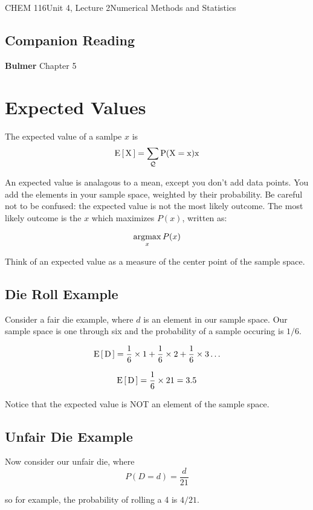 \documentclass{article}
\begin{document}
\begin{tdoc}{CHEM 116}{Unit 4, Lecture 2}{Numerical Methods and Statistics}


    \subsection*{Companion Reading}
    \textbf{Bulmer} Chapter 5

\section{Expected Values}

The expected value of a samlpe $x$ is
\begin{equation}
\rm{E}\left[\,X\,\right] = \sum_\mathcal{Q} P(X=x)x
\end{equation}

An expected value is analagous to a mean, except you don't add data
points. You add the elements in your sample space, weighted by their
probability. Be careful not to be confused: the expected value is not
the most likely outcome. The most likely outcome is the $x$ which
maximizes $P(x)$, written as:

\begin{equation}
\operatorname*{argmax}_x P(x)
\end{equation}

Think of an expected value as a measure of the center point of the sample space.

\subsection{Die Roll Example}

Consider a fair die example, where $d$ is an element in our sample
space. Our sample space is one through six and the probability of a sample
occuring is $1/6$.

\[
\rm{E}\left[\,D\,\right] = \frac{1}{6}\times{}1 + \frac{1}{6}\times{}2 + \frac{1}{6}\times{}3 \ldots
\]

\[
\rm{E}\left[\,D\,\right] = \frac{1}{6}\times 21 = 3.5
\]

Notice that the expected value is NOT an element of the sample space.

\subsection{Unfair Die Example}
Now consider our unfair die, where
\[
P(D = d) = \frac{d}{21}
\]

so for example, the probability of rolling a 4 is $4/21$.


\end{tdoc}
\end{document}
